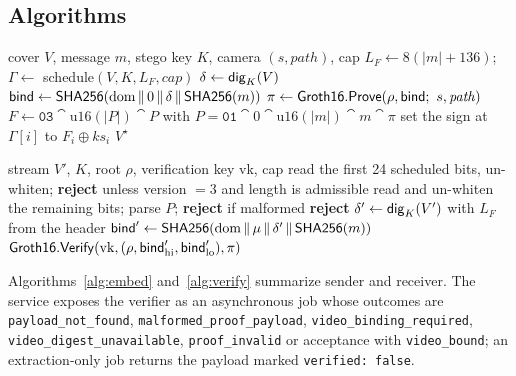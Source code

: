 \subsection{Algorithms}

\begin{algorithm}[t]
\caption{Embed (sender)}\label{alg:embed}
\begin{algorithmic}[1]
\Require cover $V$, message $m$, stego key $K$, camera $(s,\mathit{path})$, cap
\State $L_F\gets 8(|m|+136)$;\ $\Gamma\gets$ schedule$(V,K,L_F,\mathit{cap})$
\State $\delta\gets\mathsf{dig}_K(V)$ 
\State $\mathsf{bind}\gets\mathsf{SHA256}(\text{dom}\,\|\, 0\,\|\,\delta\,\|\,\mathsf{SHA256}(m))$
\State $\pi\gets\mathsf{Groth16.Prove}(\rho,\bind;\ s,\mathit{path})$
\State $F\gets\texttt{03}\cat\mathrm{u16}(|P|)\cat P$ with $P=\texttt{01}\cat0\cat\mathrm{u16}(|m|)\cat m\cat\pi$
  \State set the sign at $\Gamma[i]$ to $F_i\oplus \mathit{ks}_i$
\EndFor
\State \Return $V^{\star}$
\end{algorithmic}
\end{algorithm}

\begin{algorithm}[t]
\caption{Verify (receiver)}\label{alg:verify}
\begin{algorithmic}[1]
\Require stream $V'$, $K$, root $\rho$, verification key vk, cap
\State read the first 24 scheduled bits, un-whiten; \textbf{reject} unless version $=3$ and length is admissible
\State read and un-whiten the remaining bits; parse $P$; \textbf{reject} if malformed
 \textbf{reject}\EndIf
\State $\delta'\gets\mathsf{dig}_K(V')$ with $L_F$ from the header
\State $\mathsf{bind}'\gets\mathsf{SHA256}(\text{dom}\,\|\,\mu\,\|\,\delta'\,\|\,\mathsf{SHA256}(m))$
\State \Return $\mathsf{Groth16.Verify}(\mathrm{vk},(\rho,\mathsf{bind}'_{\mathrm{hi}},\mathsf{bind}'_{\mathrm{lo}}),\pi)$
\end{algorithmic}
\end{algorithm}

Algorithms~\ref{alg:embed} and~\ref{alg:verify} summarize sender and receiver. The service exposes the verifier as an asynchronous job whose outcomes are \texttt{payload\_not\_found}, \texttt{malformed\_proof\_payload}, \texttt{video\_binding\_required}, \texttt{video\_digest\_unavailable}, \texttt{proof\_invalid} or acceptance with \texttt{video\_bound}; an extraction-only job returns the payload marked \texttt{verified: false}.
